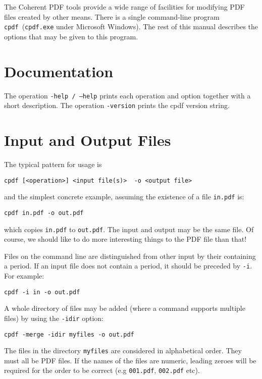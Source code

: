 \documentclass{book}
\newcommand{\cpdf}{\texttt{cpdf}}
\begin{document}
  The Coherent PDF tools provide a wide range of facilities for modifying PDF
files created by other means. There is a single command-line program
\cpdf\ (\texttt{cpdf.exe} under Microsoft Windows). The rest of this manual describes the options that may be given
to this program.

\section{Documentation}

The operation \texttt{-help / --help} prints each operation and option together with a short description. The operation \texttt{-version} prints the cpdf version string.

   
  \section{Input and Output Files}
  The typical pattern for usage is
  \begin{framed}
  \small\verb!cpdf [<operation>] <input file(s)>  -o <output file>!
  \end{framed}
  \noindent and the simplest concrete example, assuming the existence of a file
\texttt{in.pdf} is:
  \begin{framed}
  \small\verb!cpdf in.pdf -o out.pdf!
  \end{framed}
  \noindent which copies \texttt{in.pdf} to \texttt{out.pdf}. The input and
output may be the same file. Of course, we should like to do more interesting
things to the PDF file than that!

  Files on the command line are distinguished from other input by their
containing a period. If an input file does not contain a period, it should be
preceded by \verb!-i!. For example:

  \begin{framed}
  \small\verb!cpdf -i in -o out.pdf!
  \end{framed}
\noindent A whole directory of files may be added (where a command supports multiple files) by using the \verb!-idir! option:
  \begin{framed}
  \small\verb!cpdf -merge -idir myfiles -o out.pdf!
  \end{framed}
  \noindent The files in the directory \verb!myfiles! are considered in alphabetical order. They must all be PDF files. If the names of the files are numeric, leading zeroes will be required for the order to be correct (e.g \verb!001.pdf!, \verb!002.pdf! etc).
\end{document}

